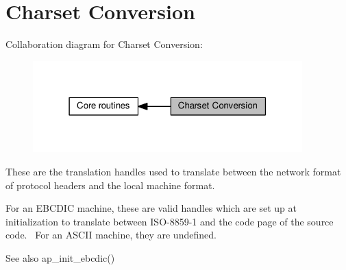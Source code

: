 \hypertarget{group__APACHE__CORE__CHARSET}{}\section{Charset Conversion}
\label{group__APACHE__CORE__CHARSET}
Collaboration diagram for Charset Conversion\+:
\nopagebreak
\begin{figure}[H]
\begin{center}
\leavevmode
\includegraphics[width=295pt]{group__APACHE__CORE__CHARSET}
\end{center}
\end{figure}
These are the translation handles used to translate between the network format of protocol headers and the local machine format.

For an E\+B\+C\+D\+IC machine, these are valid handles which are set up at initialization to translate between I\+S\+O-\/8859-\/1 and the code page of the source code.~\newline
For an A\+S\+C\+II machine, they are undefined.

\begin{DoxySeeAlso}{See also}
ap\+\_\+init\+\_\+ebcdic() 
\end{DoxySeeAlso}
